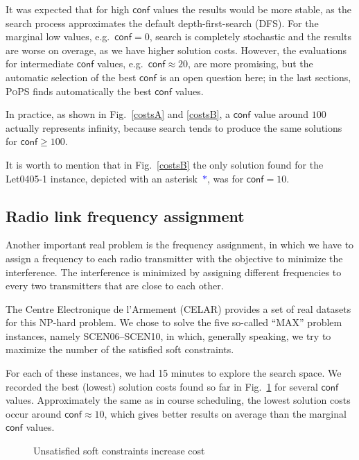 \documentclass{ws-ijait}
\begin{document}
It was expected that for high $\mathsf{conf}$ values the
results would be more stable, as the search process
approximates the default depth-first-search (DFS). For the
marginal low values, e.g.\ $\mathsf{conf} = 0$, search is
completely stochastic and the results are worse on overage,
as we have higher solution costs. However, the evaluations
for intermediate $\mathsf{conf}$ values, e.g.\ 
$\mathsf{conf} \approx 20$, are more promising, but the
automatic selection of the best $\mathsf{conf}$ is an open
question here; in the last sections, \textsc{PoPS} finds
automatically the best $\mathsf{conf}$ values.

In practice, as shown in Fig.\ \ref{costsA} and
\ref{costsB}, a $\mathsf{conf}$ value around $100$ actually
represents infinity, because search tends to produce the
same solutions for $\mathsf{conf} \geq 100$.

It is worth to mention that in Fig.~\ref{costsB} the only
solution found for the \textsf{Let0405-1} instance, depicted
with an asterisk~\textcolor{blue}{$*$}, was for
$\mathsf{conf} = 10$.

\subsection{Radio link frequency assignment}

Another important real problem is the frequency assignment,
in which we have to assign a frequency to each radio
transmitter with the objective to minimize the interference.
The interference is minimized by assigning different
frequencies to every two transmitters that are close to each
other.

The Centre Electronique de l'Armement (CELAR) provides a set
of real datasets for this NP-hard problem.\cite{Cabon1999}
We chose to solve the five so-called ``MAX'' problem
instances, namely \textsf{SCEN06}--\textsf{SCEN10}, in
which, generally speaking, we try to maximize the number of
the satisfied soft constraints.

For each of these instances, we had 15 minutes to explore
the search space. We recorded the best (lowest) solution
costs found so far in Fig.~\ref{CELAR} for several
$\mathsf{conf}$ values. Approximately the same as in course
scheduling, the lowest solution costs occur around
$\mathsf{conf} \approx 10$, which gives better results on
average than the marginal $\mathsf{conf}$ values.

\begin{figure}
  \centering
  
  \caption{Unsatisfied soft constraints increase
           cost\label{CELAR}}
\end{figure}
\end{document}
